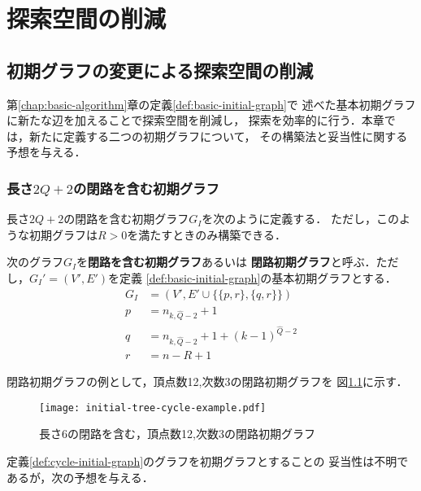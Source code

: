 
\chapter{探索空間の削減}
\label{chap:reduction}

\section{初期グラフの変更による探索空間の削減}
\label{sect:reduce-by-initial-graph}

第\ref{chap:basic-algorithm}章の定義\ref{def:basic-initial-graph}で
述べた基本初期グラフに新たな辺を加えることで探索空間を削減し，
探索を効率的に行う．本章では，新たに定義する二つの初期グラフについて，
その構築法と妥当性に関する予想を与える．

\subsection{長さ$2Q+2$の閉路を含む初期グラフ}
\label{subsect:initial-graph-cycle}
長さ$2Q+2$の閉路を含む初期グラフ$G_I$を次のように定義する．
ただし，このような初期グラフは$R>0$を満たすときのみ構築できる．

\begin{definition}\rm
  \label{def:cycle-initial-graph}
  次のグラフ$G_I$を\textbf{閉路を含む初期グラフ}あるいは
  \textbf{閉路初期グラフ}と呼ぶ．ただし，$G_I'=(V',E')$を定義
  \ref{def:basic-initial-graph}の基本初期グラフとする．
  \begin{equation}
    \begin{aligned}
      G_I&=(V',E'\cup\{\{p,r\},\{q,r\}\}) \\
      p&=n_{k,\hat{Q}-2}+1 \\
      q&=n_{k,\hat{Q}-2}+1+(k-1)^{\hat{Q}-2} \\
      r&=n-R+1
    \end{aligned}
  \end{equation}
\end{definition}

閉路初期グラフの例として，頂点数12,次数3の閉路初期グラフを
図\ref{fig:initial-graph-cycle-example}に示す．

\begin{figure}
  \centering
  \texttt{[image: initial-tree-cycle-example.pdf]}
  \caption{長さ6の閉路を含む，頂点数12,次数3の閉路初期グラフ}
  \label{fig:initial-graph-cycle-example}
\end{figure}

定義\ref{def:cycle-initial-graph}のグラフを初期グラフとすることの
妥当性は不明であるが，次の予想を与える．

